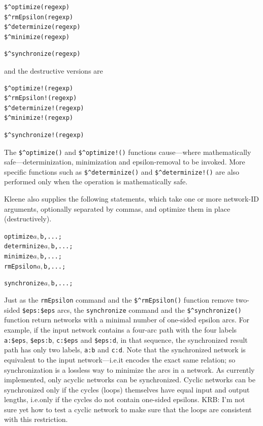 \documentclass[letterpaper,12pt]{article}
\begin{document}
\begin{Verbatim}[fontsize=\small]
$^optimize(regexp)
$^rmEpsilon(regexp)
$^determinize(regexp)
$^minimize(regexp)
\end{Verbatim}

\begin{Verbatim}[fontsize=\small]
$^synchronize(regexp)
\end{Verbatim}

\noindent
and the destructive versions are

\begin{Verbatim}[fontsize=\small]
$^optimize!(regexp)
$^rmEpsilon!(regexp)
$^determinize!(regexp)
$^minimize!(regexp)
\end{Verbatim}

\begin{Verbatim}[fontsize=\small]
$^synchronize!(regexp)
\end{Verbatim}

\noindent
The \verb!$^optimize()! and \verb/$^optimize!()/ functions cause---where
mathematically safe---determinization, minimization and epsilon-removal to
be invoked.  More specific functions such as \verb!$^determinize()! and
\verb/$^determinize!()/ are also performed only when the operation is
mathematically safe.

Kleene also supplies the following statements, which take one or more
network-ID arguments, optionally separated by commas, and optimize them
in place (destructively).

\begin{alltt}
optimize $a, $b, ... ;
determinize $a, $b, ... ;
minimize $a, $b, ... ;
rmEpsilon $a, $b, ... ;
\end{alltt}

\begin{alltt}
synchronize $a, $b, ... ;
\end{alltt}

Just as the \texttt{rmEpsilon} command and the \verb!$^rmEpsilon()!
function remove two-sided \verb!$eps:$eps! arcs, the \texttt{synchronize}
command and the \verb!$^synchronize()! function return networks with a
minimal number of one-sided epsilon arcs.  For example, if the input
network contains a four-arc path with the four labels \verb!a:$eps!,
\verb!$eps:b!, \verb!c:$eps! and \verb!$eps:d!, in that sequence, the
synchronized result path has only two labels, \verb!a:b! and \verb!c:d!.
Note that the synchronized network is equivalent to the input
network---i.e.\@ it encodes the exact same relation; so synchronization
is a lossless way to minimize the arcs in a network.  As currently
implemented, only acyclic networks can be synchronized. Cyclic
networks can be synchronized only if the cycles (loops) themselves have
equal input and output lengths, i.e.\@ only if the cycles do not contain
one-sided epsilons.  KRB:  I'm not sure yet how to test a cyclic network to
make sure that the loops are consistent with this restriction.
\end{document}
